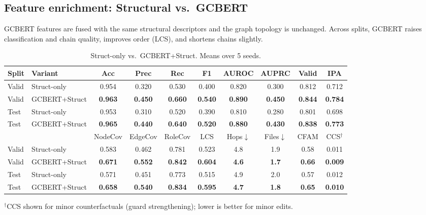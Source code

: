 \documentclass{buthesis}
\begin{document}
\subsection{Feature enrichment: Structural vs.\ GCBERT}
\label{subsec:ablate-gcbert}

GCBERT features are fused with the same structural descriptors and the graph topology is unchanged. Across splits, GCBERT raises classification and chain quality, improves order (LCS), and shortens chains slightly.

\begin{table}[H]
\centering
\small
\setlength{\tabcolsep}{2pt}
\renewcommand{\arraystretch}{1.10}
\caption{Struct-only vs.\ GCBERT+Struct. Means over 5 seeds.}
\label{tab:ablate-gcbert}
\begin{tabular}{l l c c c c c c c c}
\toprule
\textbf{Split} & \textbf{Variant} & Acc & Prec & Rec & F1 & AUROC & AUPRC & Valid & IPA \\
\midrule
Valid & Struct-only      & 0.954 & 0.320 & 0.530 & 0.400 & 0.820 & 0.300 & 0.812 & 0.712 \\
Valid & GCBERT{+}Struct & \textbf{0.963} & \textbf{0.450} & \textbf{0.660} & \textbf{0.540} & \textbf{0.890} & \textbf{0.450} & \textbf{0.844} & \textbf{0.784} \\
Test  & Struct-only      & 0.953 & 0.310 & 0.520 & 0.390 & 0.810 & 0.280 & 0.801 & 0.698 \\
Test  & GCBERT{+}Struct & \textbf{0.965} & \textbf{0.440} & \textbf{0.640} & \textbf{0.520} & \textbf{0.880} & \textbf{0.430} & \textbf{0.838} & \textbf{0.773} \\
\midrule
      &                  & NodeCov & EdgeCov & RoleCov & LCS & Hops$\downarrow$ & Files$\downarrow$ & CFAM & CCS$^\dagger$ \\
\midrule
Valid & Struct-only      & 0.583 & 0.462 & 0.781 & 0.523 & 4.8 & 1.9 & 0.58 & 0.011 \\
Valid & GCBERT{+}Struct & \textbf{0.671} & \textbf{0.552} & \textbf{0.842} & \textbf{0.604} & \textbf{4.6} & \textbf{1.7} & \textbf{0.66} & \textbf{0.009} \\
Test  & Struct-only      & 0.571 & 0.451 & 0.773 & 0.515 & 4.9 & 2.0 & 0.57 & 0.012 \\
Test  & GCBERT{+}Struct & \textbf{0.658} & \textbf{0.540} & \textbf{0.834} & \textbf{0.595} & \textbf{4.7} & \textbf{1.8} & \textbf{0.65} & \textbf{0.010} \\
\bottomrule
\end{tabular}
\begin{flushleft}
{\footnotesize $^\dagger$CCS shown for minor counterfactuals (guard strengthening); lower is better for minor edits.}
\end{flushleft}
\end{table}
\end{document}
